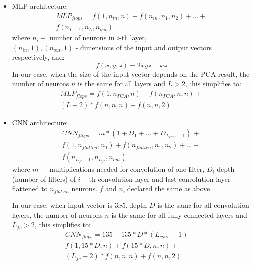 \begin{itemize}
    \item MLP architecture: \begin{equation}\begin{split}
        MLP_{flops} = f(1, n_{in}, n) + f(n_{in}, n_1, n_2) + ... + \\ f(n_{L-1}, n_L, n_{out})
    \end{split}\end{equation} where $n_i - $ number of neurons in $i$-th layer, \\ $(n_{in}, 1), (n_{out}, 1)$ - dimensions of the input and output vectors respectively, and:
    \[f(x, y, z) = 2xyz - xz\]
    In our case, when the size of the input vector depends on the PCA result, the number of neurons $n$ is the same for all layers and $L > 2$, this simplifies to:
    \begin{equation}\begin{split}
        MLP_{flops} = f(1, n_{PCA}, n) + f(n_{PCA}, n, n) + \\ (L - 2)*f(n, n, n) + f(n, n, 2)\label{eq:1}\end{split}
        \end{equation}
    \item CNN architecture: \begin{equation}\begin{split}
        CNN_{flops} = m*(1 + D_1 + ... + D_{L_{conv}-1})\, + \\ f(1, n_{flatten}, n_1) + f(n_{flatten}, n_1, n_2) + ... + \\ f(n_{L_{fc}-1}, n_{L_{fc}}, n_{out})\end{split}
    \end{equation} where $m - $ multiplications needed for convolution of one filter, $D_i$ depth (number of filters) of $i - $th convolution layer and last convolution layer flattened to $n_{flatten}$ neurons. $f$ and $n_i$ declared the same as above.
         
        In our case, when input vector is $3x5$, depth $D$ is the same for all convolution layers, the number of neurons $n$ is the same for all fully-connected layers and $L_{fc} > 2$, this simplifies to:
        \begin{equation}\begin{split}
        CNN_{flops} = 135 + 135*D*(L_{conv}-1)\, + \\ f(1, 15*D, n) + f(15*D, n, n) + \\ (L_{fc} - 2)*f(n, n, n) + f(n, n, 2)\label{eq:2}\end{split}
        \end{equation}
\end{itemize} 

